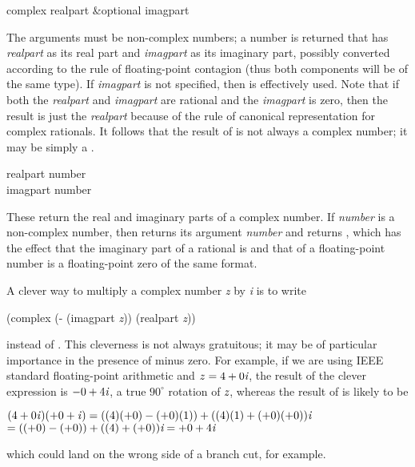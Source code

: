 \begin{defun}[Function]
complex realpart &optional imagpart

The arguments must be non-complex numbers; a number is returned
that has \emph{realpart} as its real part and \emph{imagpart} as its imaginary
part, possibly converted according to the rule of floating-point
contagion (thus both components will be of the same type).
If \emph{imagpart} is not specified,
then  is
effectively used.  Note that if both the \emph{realpart} and \emph{imagpart} are
rational and the \emph{imagpart} is zero, then the result is just the
\emph{realpart} because of the rule of canonical representation
for complex rationals.  It follows that the result of 
is not always a complex number; it may be simply a .
\end{defun}

\begin{defun}[Function]
realpart number \\
imagpart number

These return the real and imaginary parts of a complex number.  If
\emph{number} is a non-complex number, then  returns its
argument \emph{number} and 
returns , which
has the effect that the imaginary part of a rational is  and that of
a floating-point number is a floating-point zero of the same format.

\begin{newer}
A clever way to multiply a complex number \emph{z} by \emph{i} is to write
\begin{lisp}
(complex (- (imagpart \emph{z})) (realpart \emph{z}))
\end{lisp}
instead of .  This cleverness is not always
gratuitous; it may be of particular importance in the presence of minus
zero.  For example, if we are using IEEE standard floating-point arithmetic
and $z=4+0\emph{i}$, the result of the clever expression is $-0+4\emph{i}$, a true
$90^\circ$ rotation of $\emph{z}$, whereas the result of 
is likely to be
\begin{tabbing}
$ (4+0\emph{i\/})(+0+\emph{i\/}) = ((4)(+0) - (+0)(1)) + ((4)(1) + (+0)(+0))\emph{i} $ \\
\hskip2pc$ = ((+0)-(+0))+((4)+(+0))\emph{i} = +0+4\emph{i} $
\end{tabbing}
which could
land on the wrong side of a branch cut, for example.
\end{newer}
\end{defun}


